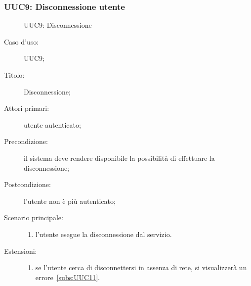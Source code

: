 \documentclass[../../../analisi-dei-requisiti.tex]{subfiles}
\begin{document}
\subsubsection{UUC9: Disconnessione utente}%
\label{subs:UU9}

\begin{figure}[H]
  \centering
  \caption{UUC9: Disconnessione}%
  \label{fig:UUC9}
\end{figure}

\begin{description}
  \item[Caso d’uso:] UUC9;
  \item[Titolo:] Disconnessione;
  \item[Attori primari:] utente autenticato;
  \item[Precondizione:] il sistema deve rendere disponibile la possibilità di effettuare la disconnessione;
  \item[Postcondizione:] l'utente non è più autenticato;
  \item[Scenario principale:]
        \begin{enumerate}
          \item l'utente esegue la disconnessione dal servizio.
        \end{enumerate}
  \item[Estensioni:]
        \begin{enumerate}
          \item se l'utente cerca di disconnettersi in assenza di rete, si visualizzerà un errore~\ref{subs:UUC11}.
        \end{enumerate}
\end{description}
\end{document}
